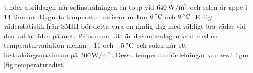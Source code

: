 Under aprildagen når solinstrålningen en topp vid $\unit[640]{W/m^2}$ och solen är uppe i 14 timmar. Dygnets temperatur varierar mellan $\unit[6]{^\circ C}$ och $\unit[9]{^\circ C}$. Enligt väderstatistik från SMHI\cite{SMHIdata} bör detta vara en rimlig dag med väldigt bra väder vid den valda tiden på året. På samma sätt är decemberdagen vald med en temperaturvariation mellan $-11$ och $\unit[-5]{^\circ C}$ och solen når ett instrålningsmaximum på $\unit[300]{W/m^2}$. Dessa temperaturfördelningar kan ses i figur \ref{fig:temperaturedist}. 









% 


